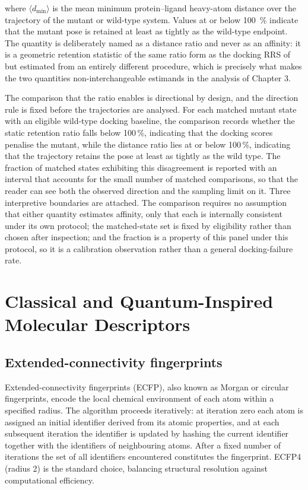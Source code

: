 where $\langle d_{\min} \rangle$ is the mean minimum protein--ligand heavy-atom distance over the trajectory of the mutant or wild-type system. Values at or below \qty{100}{\percent} indicate that the mutant pose is retained at least as tightly as the wild-type endpoint. The quantity is deliberately named as a distance ratio and never as an affinity: it is a geometric retention statistic of the same ratio form as the docking RRS of  but estimated from an entirely different procedure, which is precisely what makes the two quantities non-interchangeable estimands in the analysis of Chapter 3.

The comparison that the ratio enables is directional by design, and the direction rule is fixed before the trajectories are analysed. For each matched mutant state with an eligible wild-type docking baseline, the comparison records whether the static retention ratio falls below \num{100}\,\%, indicating that the docking scores penalise the mutant, while the distance ratio lies at or below \num{100}\,\%, indicating that the trajectory retains the pose at least as tightly as the wild type. The fraction of matched states exhibiting this disagreement is reported with an interval that accounts for the small number of matched comparisons, so that the reader can see both the observed direction and the sampling limit on it. Three interpretive boundaries are attached. The comparison requires no assumption that either quantity estimates affinity, only that each is internally consistent under its own protocol; the matched-state set is fixed by eligibility rather than chosen after inspection; and the fraction is a property of this panel under this protocol, so it is a calibration observation rather than a general docking-failure rate.

\section{Classical and Quantum-Inspired Molecular Descriptors}\label{sec:descriptors_methods}

\subsection{Extended-connectivity fingerprints}

Extended-connectivity fingerprints (ECFP), also known as Morgan or circular fingerprints, encode the local chemical environment of each atom within a specified radius. The algorithm proceeds iteratively: at iteration zero each atom is assigned an initial identifier derived from its atomic properties, and at each subsequent iteration the identifier is updated by hashing the current identifier together with the identifiers of neighbouring atoms. After a fixed number of iterations the set of all identifiers encountered constitutes the fingerprint. ECFP4 (radius \num{2}) is the standard choice, balancing structural resolution against computational efficiency.

